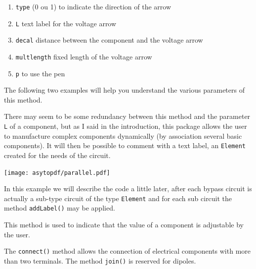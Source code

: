 \documentclass[10pt]{article}
\begin{document}
\begin{enumerate}
\item \verb|type| (0 ou 1) to indicate the direction of the arrow
\item \verb|L| text label for the voltage arrow
\item \verb|decal| distance between the component and the voltage arrow
\item \verb|multlength| fixed length of the voltage arrow
\item \verb|p| to use the pen
\end{enumerate}
The following two examples will help you understand the various parameters of this method.



{}
There may seem to be some redundancy between this method and the parameter \verb|L| of a component, but as I said in the introduction, this package allows the user to manufacture complex components dynamically (by association several basic components). It will then be possible to comment with a text label, an \verb|Element| created for the needs of the circuit.
\begin{center}
\texttt{[image: asytopdf/parallel.pdf]}
\end{center}
In this example we will describe the code a little later, after each bypass circuit is actually a sub-type circuit of the type \verb|Element| and for each sub circuit the method \verb|addLabel()| may be applied.

{}
This method is used to indicate that the value of a component is adjustable by the user.


{}
The \verb|connect()| method allows the connection of electrical components with more than two terminals. The method \verb|join()| is reserved for dipoles.
\end{document}
